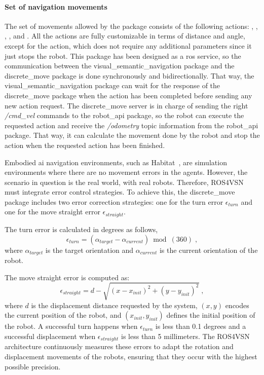 \paragraph*{\textbf{Set of navigation movements}}\label{par:movement-set}

The set of movements allowed by the package consists of the following actions: \turnleft, \turnright, \moveforward, \movebackward, and \stopac.
All the actions are fully customizable in terms of distance and angle, except for the \stopac action, which does not require any additional parameters since it just stops the robot.
This package has been designed as a \acrshort{ros} service, so the communication between the visual\_semantic\_navigation package and the discrete\_move package is done synchronously and bidirectionally.
That way, the visual\_semantic\_navigation package can wait for the response of the discrete\_move package when the action has been completed before sending any new action request.
The discrete\_move server is in charge of sending the right \textit{/cmd\_vel} commands to the robot\_api package, so the robot can execute the requested action and receive the \textit{/odometry} topic information from the robot\_api package.
That way, it can calculate the movement done by the robot and stop the action when the requested action has been finished.

Embodied \acrshort{ai} navigation environments, such as Habitat~\cite{NEURIPS2021_021bbc7e}, are simulation environments where there are no movement errors in the agents.
However, the scenario in question is the real world, with real robots.
Therefore, ROS4VSN must integrate error control strategies.
To achieve this, the discrete\_move package includes two error correction strategies: one for the turn error $\epsilon_{turn}$ and one for the move straight error $\epsilon_{straight}$.

The turn error is calculated in degrees as follows,
\begin{equation}
    \label{eq:turn_error}
    \epsilon_{turn} = (\alpha_{target}- \alpha_{current}) \bmod(360)\; ,
\end{equation}
where $\alpha_{target}$ is the target orientation and $\alpha_{current}$ is the current orientation of the robot.

The move straight error is computed as:
\begin{equation}
    \label{eq:error_move}
    \epsilon_{straight} = {d - \sqrt{(x-x_{init})^2+(y-y_{init})^2}}\; ,
\end{equation}
where $d$ is the displacement distance requested by the system, $(x,y)$ encodes the current position of the robot, and $(x_{init},y_{init})$ defines the initial position of the robot.
A successful turn happens when $\epsilon_{turn}$ is less than 0.1 degrees and a successful displacement when $\epsilon_{straight}$ is less than 5 millimeters.
The ROS4VSN architecture continuously measures these errors to adapt the rotation and displacement movements of the robots, ensuring that they occur with the highest possible precision.

